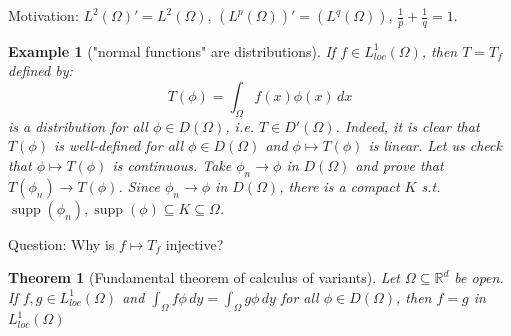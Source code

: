 \documentclass{report}
\theoremstyle{tommy}
\newtheorem{thm}[defn]{Theorem}
\newtheorem{eg}[defn]{Example}
\newcommand{\dist}{\operatorname{dist}}
\newcommand{\supp}{\operatorname{supp}}
\begin{document}
  Motivation: \(L^2(\Omega)' = L^2(\Omega)\), \((L^p(\Omega))' = (L^q(\Omega))\), \(\frac{1}{p} + \frac{1}{q} = 1\).


  \begin{eg}["normal functions" are distributions]
    If \(f \in L_{loc}^1(\Omega)\), then \(T = T_f\) defined by:
    \[T(\phi) = \int_{\Omega} f(x) \phi(x) \, dx\]
    is a distribution for all \(\phi \in D(\Omega)\), i.e. \(T \in D'(\Omega)\). Indeed, it is clear that \(T(\phi)\) is well-defined for all \(\phi \in D(\Omega)\) and \(\phi \mapsto T(\phi)\) is linear. Let us check that \(\phi \mapsto T(\phi)\) is continuous. Take \(\phi_n \to \phi\) in \(D(\Omega)\) and prove that \(T(\phi_n) \to T(\phi)\). Since \(\phi_n \to \phi\) in \(D(\Omega)\), there is a compact \(K\) s.t. \(\supp(\phi_n), \supp(\phi) \subseteq K \subseteq \Omega\).
  \end{eg}

  Question: Why is \(f \mapsto T_f\) injective?

  \begin{thm}[Fundamental theorem of calculus of variants]
    Let \(\Omega \subseteq \mathbb{R}^d\) be open. If \(f, g \in L_{loc}^1(\Omega)\) and 
    \(\int_\Omega f \phi \, dy = \int_{\Omega} g \phi \, dy\) for all \(\phi \in D(\Omega) \), then \(f = g\) in \(L_{loc}^1(\Omega)\)
  \end{thm}

  
\end{document}
